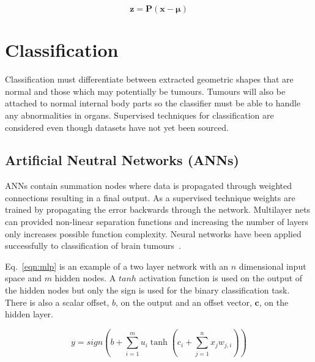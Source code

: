 \documentclass[journal]{IEEEtran}
\begin{document}
\begin{equation}
	\boldsymbol{z} = \boldsymbol{P}(\boldsymbol{x} - \boldsymbol{\mu})
	\label{eqn:PCA}
\end{equation}












\section{Classification}
\label{sec:class}

Classification must differentiate between extracted geometric shapes that are normal and those which may potentially be tumours.
Tumours will also be attached to normal internal body parts so the classifier must be able to handle any abnormalities in organs.
Supervised techniques for classification are considered even though datasets have not yet been sourced.



\subsection{Artificial Neutral Networks (ANNs)}
ANNs contain summation nodes where data is propagated through weighted connections resulting in a final output. 
As a supervised technique weights are trained by propagating the error backwards through the network.
Multilayer nets can provided non-linear separation functions and increasing the number of layers only increases possible function complexity.
Neural networks have been applied successfully to classification of brain tumours~\cite{amin12brain}.

Eq.~\eqref{eqn:mlp} is an example of a two layer network with an $n$ dimensional input space and $m$ hidden nodes.
A $tanh$ activation function is used on the output of the hidden nodes but only the sign is used for the binary classification task.
There is also a scalar offset, $b$, on the output and an offset vector, $\mathbf{c}$, on the hidden layer. 

\begin{equation}
	y = sign \left(b + \sum_{i=1}^{m} u_i \tanh \left(c_i + \sum_{j=1}^{n} x_j w_{j,i}\right)  \right) 
	\label{eqn:mlp}
\end{equation}
\end{document}
